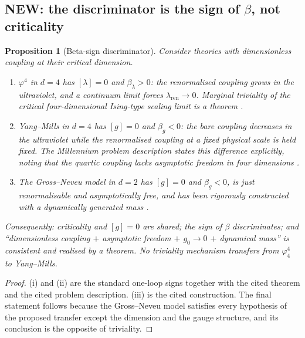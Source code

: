 \documentclass[11pt,a4paper]{article}
\theoremstyle{plain}
\newtheorem{proposition}[theorem]{Proposition}
\theoremstyle{definition}
\theoremstyle{remark}
\renewcommand{\_}{\oldunderscore\allowbreak}
\begin{document}
\subsection{NEW: the discriminator is the sign of \texorpdfstring{$\beta$}{beta}, not criticality}
\label{sub:betasign}
\begin{proposition}[Beta-sign discriminator]\label{prop:betasign}
Consider theories with dimensionless coupling at their critical dimension.
\begin{enumerate}[label=(\roman*),leftmargin=22pt,itemsep=1pt]
\item $\varphi^4$ in $d=4$ has $[\lambda]=0$ and $\beta_\lambda>0$: the renormalised coupling
grows in the ultraviolet, and a continuum limit forces $\lambda_{\mathrm{ren}}\to0$. Marginal
triviality of the critical four-dimensional Ising-type scaling limit is a theorem
\cite{ADC2021,ADC2024}.
\item Yang--Mills in $d=4$ has $[g]=0$ and $\beta_g<0$: the bare coupling decreases in the
ultraviolet while the renormalised coupling at a fixed physical scale is held fixed. The
Millennium problem description states this difference explicitly, noting that the quartic
coupling \emph{lacks} asymptotic freedom in four dimensions \cite{JaffeWitten2000}.
\item The Gross--Neveu model in $d=2$ has $[g]=0$ and $\beta_g<0$, is just renormalisable and
asymptotically free, and has been \emph{rigorously constructed with a dynamically generated
mass} \cite{FMRS1986,GK1985}.
\end{enumerate}
Consequently: criticality and $[g]=0$ are \emph{shared}; the sign of $\beta$ discriminates; and
``dimensionless coupling $+$ asymptotic freedom $+$ $g_0\to0$ $+$ dynamical mass'' is
\emph{consistent and realised by a theorem}. No triviality mechanism transfers from
$\varphi^4_4$ to Yang--Mills.
\end{proposition}
\begin{proof}
(i) and (ii) are the standard one-loop signs together with the cited theorem and the cited
problem description. (iii) is the cited construction. The final statement follows because the
Gross--Neveu model satisfies every hypothesis of the proposed transfer except the dimension and
the gauge structure, and its conclusion is the opposite of triviality.
\end{proof}
\end{document}
